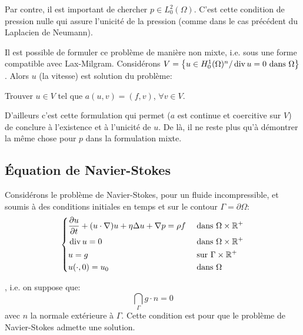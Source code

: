 Par contre, il est important de chercher $p \in L^2_0(\Omega)$. C'est cette condition
de pression nulle qui assure l'unicité de la pression (comme dans le cas précédent du
Laplacien de Neumann).

\medskip
Il est possible de formuler ce problème de manière non mixte, i.e. sous une forme
compatible avec Lax-Milgram.
Considérons $V=\left\{ u\in H^1_0(\Omega)^n / \operatorname{div} u=0 \text{ dans } \Omega\right\}$.
Alors $u$ (la vitesse) est solution du problème:
\begin{center}
Trouver $u\in V$ tel que $a(u,v)=(f,v)$, $\forall v\in V$.
\end{center}
D'ailleurs c'est cette formulation qui permet ($a$ est continue et coercitive sur $V$) de
conclure à l'existence et à l'unicité de $u$.
De là, il ne reste plus qu'à démontrer la même chose pour $p$ dans la formulation mixte.

\medskip
\subsection{Équation de Navier-Stokes}

Considérons le problème de Navier-Stokes, pour un fluide incompressible, et soumis
à des conditions initiales en temps et sur le contour $\Gamma=\partial\Omega$:
\begin{equation}\left\{
\begin{aligned}
&\dfrac{\partial u}{\partial t} + (u\cdot\nabla) u + \eta\Delta u + \nabla p  = \rho f && \text{ dans } \Omega\times\mathbb R^+\\
&\operatorname{div} u = 0&& \text{ dans } \Omega\times\mathbb R^+\\
&u=g &&\text{ sur } \Gamma\times\mathbb R^+\\
&u(\cdot,0) =u_0 &&\text{ dans }\Omega
\end{aligned}\right.
\end{equation}

, i.e. on suppose que:
\begin{equation}
\dint_\Gamma g\cdot n %
= 0
\end{equation}
avec $n$ la normale extérieure à $\Gamma$.
Cette condition est  pour que le problème de Navier-Stokes admette une
solution.

